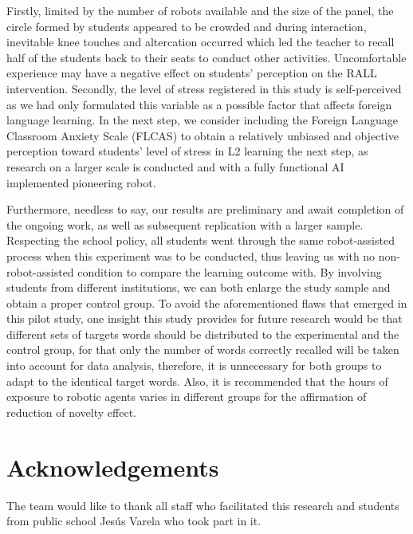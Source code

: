 \documentclass[english]{textolivre}
\begin{document}
Firstly, limited by the number of robots available and the size of the panel, the circle formed by students appeared to be crowded and during interaction, inevitable knee touches and altercation occurred which led the teacher to recall half of the students back to their seats to conduct other activities. Uncomfortable experience may have a negative effect on students’ perception on the RALL intervention. Secondly, the level of stress registered in this study is self-perceived as we had only formulated this variable as a possible factor that affects foreign language learning. In the next step, we consider including the Foreign Language Classroom Anxiety Scale (FLCAS) to obtain a relatively unbiased and objective perception toward students’ level of stress in L2 learning the next step, as research on a larger scale is conducted and with a fully functional AI implemented pioneering robot.

Furthermore, needless to say, our results are preliminary and await completion of the ongoing work, as well as subsequent replication with a larger sample. Respecting the school policy, all students went through the same robot-assisted process when this experiment was to be conducted, thus leaving us with no non-robot-assisted condition to compare the learning outcome with. By involving students from different institutions, we can both enlarge the study sample and obtain a proper control group. To avoid the aforementioned flaws that emerged in this pilot study, one insight this study provides for future research would be that different sets of targets words should be distributed to the experimental and the control group, for that only the number of words correctly recalled will be taken into account for data analysis, therefore, it is unnecessary for both groups to adapt to the identical target words. Also, it is recommended that the hours of exposure to robotic agents varies in different groups for the affirmation of reduction of novelty effect.

\section{Acknowledgements}\label{sec-figuras-tabelas}
The team would like to thank all staff who facilitated this research and students from public school Jesús Varela who took part in it.


\printbibliography\label{sec-bib}
\end{document}

